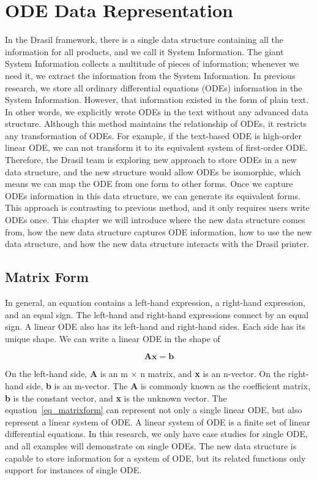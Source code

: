 \chapter{ODE Data Representation}
In the Drasil framework, there is a single data structure containing all the information for all products, and we call it System Information. The giant System Information collects a multitude of pieces of information; whenever we need it, we extract the information from the System Information. In previous research, we store all ordinary differential equations (ODEs) information in the System Information. However, that information existed in the form of plain text. In other words, we explicitly wrote ODEs in the text without any advanced data structure. Although this method maintains the relationship of ODEs, it restricts any transformation of ODEs. For example, if the text-based ODE is high-order linear ODE, we can not transform it to its equivalent system of first-order ODE. Therefore, the Drasil team is exploring new approach to store ODEs in a new data structure, and the new structure would allow ODEs be isomorphic, which means we can map the ODE from one form to other forms. Once we capture ODEs information in this data structure, we can generate its equivalent forms. This approach is contrasting to previous method, and it only requires users write ODEs once. This chapter we will introduce where the new data structure comes from, how the new data structure captures ODE information, how to use the new data structure, and how the new data structure interacts with the Drasil printer.

\section{Matrix Form}
In general, an equation contains a left-hand expression, a right-hand expression, and an equal sign. The left-hand and right-hand expressions connect by an equal sign. A linear ODE also has its left-hand and right-hand sides. Each side has its unique shape. We can write a linear ODE in the shape of

\begin{equation} \label{eq_matrixform}
	\boldsymbol{Ax} = \boldsymbol{b}
\end{equation}

On the left-hand side, \textbf{A} is an m $\times$ n matrix, and \textbf{x} is an n-vector. On the right-hand side, \textbf{b} is an m-vector. The \textbf{A} is commonly known as the coefficient matrix, \textbf{b} is the constant vector, and \textbf{x} is the unknown vector. The equation~\ref{eq_matrixform} can represent not only a single linear ODE, but also represent a linear system of ODE. A linear system of ODE is a finite set of linear differential equations. In this research, we only have case studies for single ODE, and all examples will demonstrate on single ODEs. The new data structure is capable to store information for a system of ODE, but its related functions only support for instances of single ODE.

